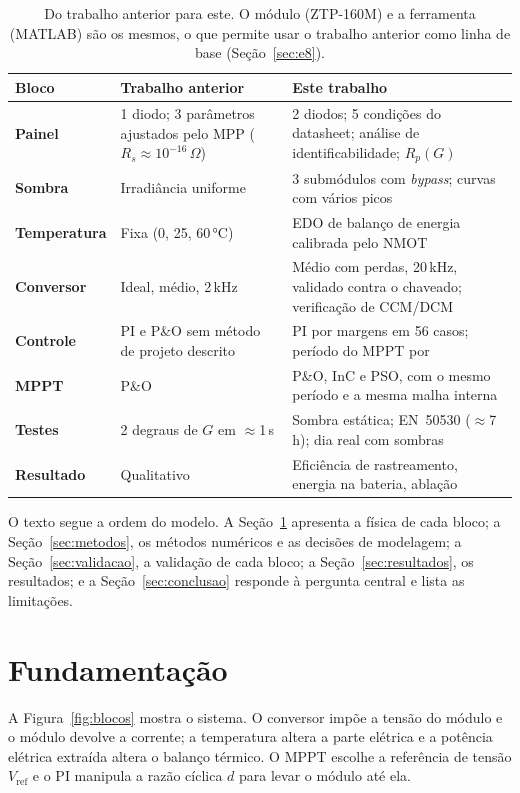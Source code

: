 \documentclass[3p,authoryear]{elsarticle}
\newcommand{\Vref}{V_{\mathrm{ref}}}
\begin{document}
\begin{table}[!htbp]
\centering\small
\renewcommand{\arraystretch}{1.15}
\begin{tabularx}{\linewidth}{>{\bfseries}l X X}
\toprule
Bloco & Trabalho anterior \citep{anterior} & Este trabalho \\
\midrule
Painel & 1 diodo; 3 parâmetros ajustados pelo MPP ($R_s\approx10^{-16}\,\Omega$) &
2 diodos; 5 condições do datasheet; análise de identificabilidade; $R_p(G)$ \\
Sombra & Irradiância uniforme & 3 submódulos com \emph{bypass}; curvas com vários picos \\
Temperatura & Fixa (0, 25, 60\,°C) & EDO de balanço de energia calibrada pelo NMOT \\
Conversor & Ideal, médio, 2\,kHz & Médio com perdas, 20\,kHz, validado contra o chaveado;
verificação de CCM/DCM \\
Controle & PI e P\&O sem método de projeto descrito & PI por margens em 56 casos; período do MPPT por
\citet{femia} \\
MPPT & P\&O & P\&O, InC e PSO, com o mesmo período e a mesma malha interna \\
Testes & 2 degraus de $G$ em $\approx$1\,s & Sombra estática; EN~50530 ($\approx$7\,h); dia
real com sombras \\
Resultado & Qualitativo & Eficiência de rastreamento, energia na bateria, ablação \\
\bottomrule
\end{tabularx}
\caption{Do trabalho anterior para este. O módulo (ZTP-160M) e a ferramenta (MATLAB) são os mesmos, o que permite usar o trabalho anterior como linha de
base (Seção~\ref{sec:e8}).}
\label{tab:comparacao}
\end{table}

O texto segue a ordem do modelo. A Seção~\ref{sec:fund} apresenta a física de cada bloco; a
Seção~\ref{sec:metodos}, os métodos numéricos e as decisões de modelagem; a
Seção~\ref{sec:validacao}, a validação de cada bloco; a Seção~\ref{sec:resultados}, os
resultados; e a Seção~\ref{sec:conclusao} responde à pergunta central e lista as limitações.

\section{Fundamentação}
\label{sec:fund}

A Figura~\ref{fig:blocos} mostra o sistema. O conversor impõe a tensão do módulo e o
módulo devolve a corrente; a temperatura altera a parte elétrica e a potência elétrica
extraída altera o balanço térmico. O MPPT escolhe a referência de tensão $\Vref$ e o PI
manipula a razão cíclica $d$ para levar o módulo até ela.
\end{document}
